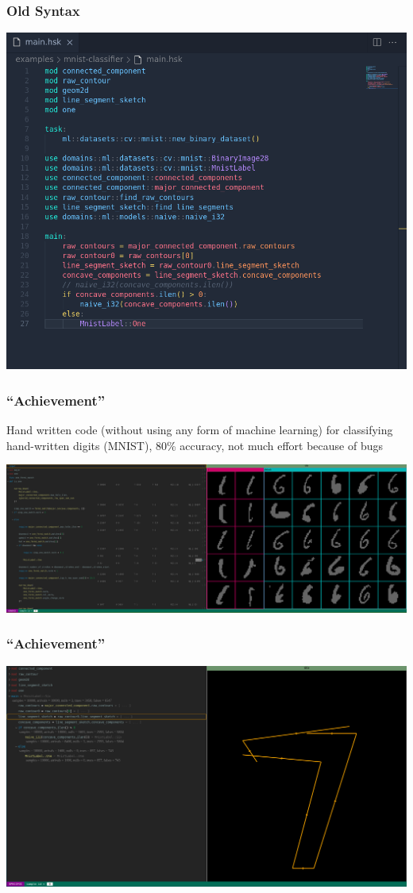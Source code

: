 \documentclass{beamer}   	%
\theoremstyle{definition}
\begin{document}
\begin{frame}
\frametitle{Old Syntax}
\includegraphics[width=\linewidth]{snapshots/old_syntax00}
\end{frame}

\begin{frame}
\frametitle{``Achievement''} Hand written code (without using any form of machine learning) for classifying hand-written digits (MNIST), 80\% accuracy, not much effort because of bugs

\includegraphics[width=\linewidth]{snapshots/mnist_debug_screenshot00.png}
\end{frame}

\begin{frame}
\frametitle{``Achievement''}

\includegraphics[width=\linewidth]{snapshots/mnist_debug_screenshot01.png}
\end{frame}
\end{document}
